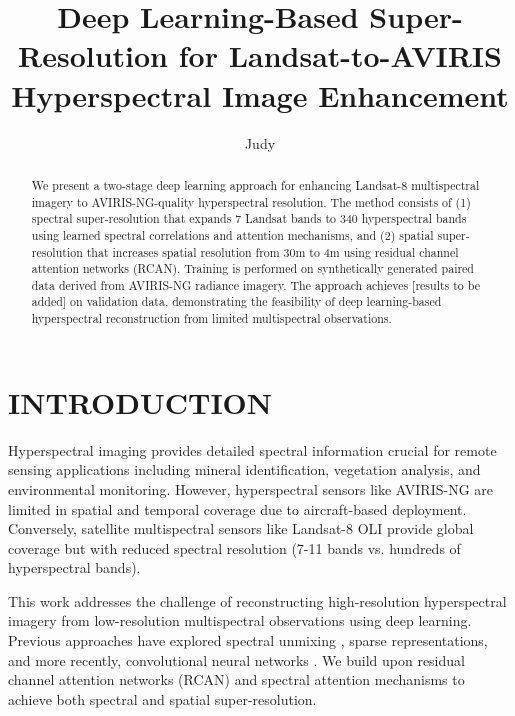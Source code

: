 \documentclass[]{spieman}
\title{Deep Learning-Based Super-Resolution for Landsat-to-AVIRIS Hyperspectral Image Enhancement}
\author[a]{Judy}
\affil[a]{Department, Institution, Address}
\begin{document}
\maketitle

\begin{abstract}
We present a two-stage deep learning approach for enhancing Landsat-8 multispectral imagery to AVIRIS-NG-quality hyperspectral resolution. The method consists of (1) spectral super-resolution that expands 7 Landsat bands to 340 hyperspectral bands using learned spectral correlations and attention mechanisms, and (2) spatial super-resolution that increases spatial resolution from 30m to 4m using residual channel attention networks (RCAN). Training is performed on synthetically generated paired data derived from AVIRIS-NG radiance imagery. The approach achieves [results to be added] on validation data, demonstrating the feasibility of deep learning-based hyperspectral reconstruction from limited multispectral observations.
\end{abstract}



\section{INTRODUCTION}
\label{sec:intro}

Hyperspectral imaging provides detailed spectral information crucial for remote sensing applications including mineral identification, vegetation analysis, and environmental monitoring. However, hyperspectral sensors like AVIRIS-NG \cite{green2015aviris} are limited in spatial and temporal coverage due to aircraft-based deployment. Conversely, satellite multispectral sensors like Landsat-8 OLI \cite{roy2014landsat} provide global coverage but with reduced spectral resolution (7-11 bands vs. hundreds of hyperspectral bands).

This work addresses the challenge of reconstructing high-resolution hyperspectral imagery from low-resolution multispectral observations using deep learning. Previous approaches have explored spectral unmixing \cite{dong2016hyperspectral}, sparse representations, and more recently, convolutional neural networks \cite{sidorov2019deep, xie2018multispectral}. We build upon residual channel attention networks (RCAN) \cite{zhang2018rcan} and spectral attention mechanisms \cite{shi2019spectral} to achieve both spectral and spatial super-resolution.
\end{document}
